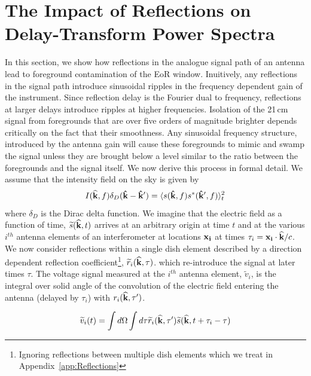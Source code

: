 \documentclass[onecolumn]{emulateapj}
\begin{document}
\section{The Impact of Reflections on Delay-Transform Power Spectra}\label{sec:Formalism}
In this section, we show how reflections in the analogue signal path of an antenna lead to foreground contamination of the EoR window. Inuitively, any reflections in the signal path introduce sinusoidal ripples in the frequency dependent gain of the instrument. Since reflection delay is the Fourier dual to frequency, reflections at larger delays introduce ripples at higher frequencies. Isolation of the 21\,cm signal from foregrounds that are over five orders of magnitude brighter depends critically on the fact that their smoothness. Any sinusoidal frequency structure, introduced by the antenna gain will cause these foregrounds to mimic and swamp the signal unless they are brought below a level similar to the ratio between the foregrounds and the signal itself. We now derive this process in formal detail. We assume that the intensity field on the sky is given by 
\begin{equation}\label{eq:Dirac}
I({\bf \widehat{k}},f) \delta_D({\bf \hat{k}} - {\bf \hat{k}'})= \langle s({\bf \hat{k}},f)s^*({\bf \hat{k}'},f)  \rangle_t^2
\end{equation}
 where $\delta_D$ is the Dirac delta function. We imagine that the electric field as a function of time, $\widetilde{s}({\bf \widehat{k}},t)$ arrives at an arbitrary origin at time $t$ and at the various $i^{th}$ antenna elements of an interferometer at locations ${\bf x_i}$ at times $\tau_i={\bf x_i} \cdot {\bf \widehat{k}} /c$. We now consider reflections within a single dish element described by a direction dependent reflection coefficient\footnote{Ignoring reflections between multiple dish elements which we treat in Appendix~\ref{app:Reflections}}, $\widetilde{r}_i({\bf \widehat{k}},\tau)$. which re-introduce the signal at later times $\tau$. The voltage signal measured at the $i^{th}$ antenna element, $\widetilde{v}_i$, is the integral over solid angle of the convolution of the electric field entering the antenna (delayed by $\tau_i$) with $r_i({\bf \widehat{k}},\tau')$.

\begin{equation}
\widetilde{v}_i(t) = \int d \Omega \int d \tau \widetilde{r}_i({\bf \widehat{k}},\tau') \widetilde{s}({\bf \widehat{k}},t+\tau_i - \tau)
\end{equation}
\end{document}
